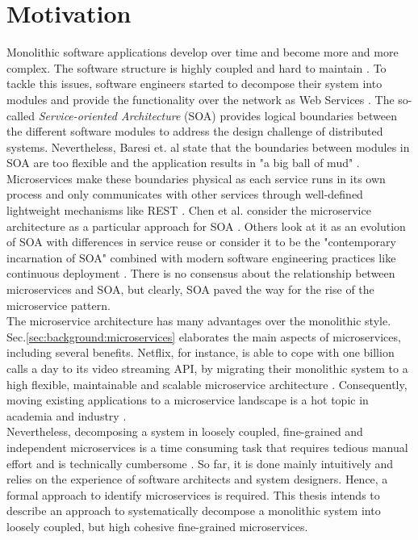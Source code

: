 \section{Motivation}
\label{sec:Introduction:Motivation}
Monolithic software applications develop over time and become more and more complex. The software structure is highly coupled and hard to maintain \cite{MigratingTowardsSurvey}. To tackle this issues, software engineers started to decompose their system into modules and provide the functionality over the network as Web Services \cite{ServiceCutter}. The so-called \textit{Service-oriented Architecture} (SOA) provides logical boundaries between the different software modules to address the design challenge of distributed systems. Nevertheless, Baresi et. al state that the boundaries between modules in SOA are too flexible and the application results in "a big ball of mud" \cite{interfaceAnalysisBaresi}. Microservices make these boundaries physical as each service runs in its own process and only communicates with other services through well-defined lightweight mechanisms like REST \cite{FunctionalDecompositionHeinrich}. Chen et al. consider the microservice architecture as a particular approach for SOA \cite{DataflowDrivenChen}. Others look at it as an evolution of SOA with differences in service reuse \cite{interfaceAnalysisBaresi} or consider it to be the "contemporary incarnation of SOA" combined with modern software engineering practices like continuous deployment \cite{ServiceCutter}. There is no consensus about the relationship between microservices and SOA, but clearly, SOA paved the way for the rise of the microservice pattern.\\
The microservice architecture has many advantages over the monolithic style. Sec.\ref{sec:background:microservices} elaborates the main aspects of microservices, including several benefits. Netflix, for instance, is able to cope with one billion calls a day to its video streaming API, by migrating their monolithic system to a high flexible, maintainable and scalable microservice architecture \cite{DataflowDrivenChen}. Consequently, moving existing applications to a microservice landscape is a hot topic in academia and industry \cite{ObjectAwareAmiri}. \\
Nevertheless, decomposing a system in loosely coupled, fine-grained and independent microservices is a time consuming task that requires tedious manual effort \cite{ServiceCutter} and is technically cumbersome \cite{HeuristicsAlwis}. So far, it is done mainly intuitively and relies on the experience of software architects and system designers. Hence, a formal approach to identify microservices is required. This thesis intends to describe an approach to systematically decompose a monolithic system into loosely coupled, but high cohesive fine-grained microservices. 



